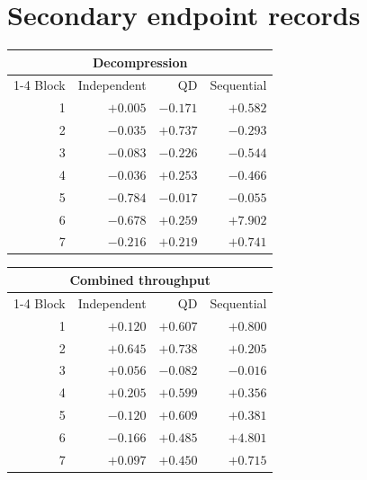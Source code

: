 \documentclass[10pt,twocolumn]{article}
\begin{document}
\section{Secondary endpoint records}
\label{app:secondary-endpoints}

\begin{center}
  \label{tab:secondary-endpoints}
  {\setlength{\tabcolsep}{3pt}
  \begin{tabular}{@{}r rrr@{}}
    \toprule
    \multicolumn{4}{c}{Decompression} \\
    \cmidrule(lr){1-4}
    Block & Independent & QD & Sequential \\
    \midrule
    1 & $+0.005$ & $-0.171$ & $+0.582$ \\
    2 & $-0.035$ & $+0.737$ & $-0.293$ \\
    3 & $-0.083$ & $-0.226$ & $-0.544$ \\
    4 & $-0.036$ & $+0.253$ & $-0.466$ \\
    5 & $-0.784$ & $-0.017$ & $-0.055$ \\
    6 & $-0.678$ & $+0.259$ & $+7.902$ \\
    7 & $-0.216$ & $+0.219$ & $+0.741$ \\
    \bottomrule
  \end{tabular}}

  \vspace{0.6em}

  {\setlength{\tabcolsep}{3pt}
  \begin{tabular}{@{}r rrr@{}}
    \toprule
    \multicolumn{4}{c}{Combined throughput} \\
    \cmidrule(lr){1-4}
    Block & Independent & QD & Sequential \\
    \midrule
    1 & $+0.120$ & $+0.607$ & $+0.800$ \\
    2 & $+0.645$ & $+0.738$ & $+0.205$ \\
    3 & $+0.056$ & $-0.082$ & $-0.016$ \\
    4 & $+0.205$ & $+0.599$ & $+0.356$ \\
    5 & $-0.120$ & $+0.609$ & $+0.381$ \\
    6 & $-0.166$ & $+0.485$ & $+4.801$ \\
    7 & $+0.097$ & $+0.450$ & $+0.715$ \\
    \bottomrule
  \end{tabular}}
\end{center}

\clearpage
\setlength{\bibsep}{0pt}


\end{document}
